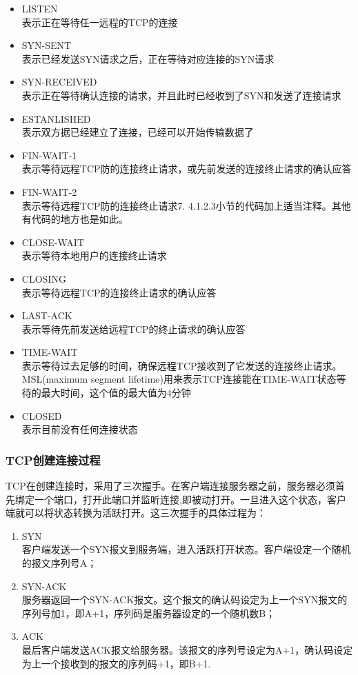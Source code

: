 \documentclass[format=final, language=chinese, degree=fyp]{hustthesis}
\begin{document}
\begin{itemize}
	\item LISTEN \\
 表示正在等待任一远程的TCP的连接
	\item SYN-SENT \\
 表示已经发送SYN请求之后，正在等待对应连接的SYN请求
	\item SYN-RECEIVED \\
 表示正在等待确认连接的请求，并且此时已经收到了SYN和发送了连接请求
	\item ESTANLISHED \\
 表示双方据已经建立了连接，已经可以开始传输数据了
	\item FIN-WAIT-1 \\
 表示等待远程TCP防的连接终止请求，或先前发送的连接终止请求的确认应答
	\item FIN-WAIT-2 \\
 表示等待远程TCP防的连接终止请求7.	4.1.2.3小节的代码加上适当注释。其他有代码的地方也是如此。
	\item CLOSE-WAIT \\
 表示等待本地用户的连接终止请求
	\item CLOSING \\
 表示等待远程TCP的连接终止请求的确认应答
	\item LAST-ACK \\
 表示等待先前发送给远程TCP的终止请求的确认应答
	\item TIME-WAIT \\
 表示等待过去足够的时间，确保远程TCP接收到了它发送的连接终止请求。MSL(maximum segment lifetime)用来表示TCP连接能在TIME-WAIT状态等待的最大时间，这个值的最大值为4分钟
	\item CLOSED \\
  表示目前没有任何连接状态
\end{itemize}

\subsubsection{TCP创建连接过程}



TCP在创建连接时，采用了三次握手。在客户端连接服务器之前，服务器必须首先绑定一个端口，打开此端口并监听连接,即被动打开。一旦进入这个状态，客户端就可以将状态转换为活跃打开。这三次握手的具体过程为：

\begin{enumerate}
	\item SYN \\ 客户端发送一个SYN报文到服务端，进入活跃打开状态。客户端设定一个随机的报文序列号A；
	\item SYN-ACK \\ 服务器返回一个SYN-ACK报文。这个报文的确认码设定为上一个SYN报文的序列号加1，即A+1，序列码是服务器设定的一个随机数B；
	\item ACK \\ 最后客户端发送ACK报文给服务器。该报文的序列号设定为A+1，确认码设定为上一个接收到的报文的序列码+1，即B+1.
\end{enumerate}
\end{document}
